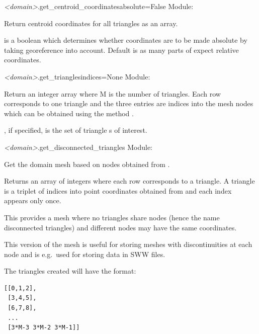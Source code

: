 \documentclass{manual}
\begin{document}
\begin{methoddesc}{\emph{<domain>}.get_centroid_coordinates}{absolute=False}
Module: 

Return centroid coordinates for all triangles as an  array.
    
 is a boolean which determines whether coordinates
are to be made absolute by taking georeference into account.
Default is  as many parts of \anuga expect relative coordinates.
\end{methoddesc}

\begin{methoddesc}{\emph{<domain>}.get_triangles}{indices=None}
Module: 

Return an  integer array where M is the number of triangles.
Each row corresponds to one triangle and the three entries are
indices into the mesh nodes which can be obtained using the method
.

, if specified, is the set of triangle s of interest.
\end{methoddesc}

\begin{methoddesc}{\emph{<domain>}.get_disconnected_triangles}{}
Module: 

Get the domain mesh based on nodes obtained from .

Returns an  array of integers where each row corresponds to
a triangle. A triangle is a triplet of indices into
point coordinates obtained from  and each
index appears only once.

This provides a mesh where no triangles share nodes
(hence the name disconnected triangles) and different
nodes may have the same coordinates.

This version of the mesh is useful for storing meshes with
discontinuities at each node and is e.g.\ used for storing
data in SWW files.

The triangles created will have the format:

\begin{verbatim}
[[0,1,2],
 [3,4,5],
 [6,7,8],
 ...
 [3*M-3 3*M-2 3*M-1]]
\end{verbatim}
\end{methoddesc}
\end{document}
